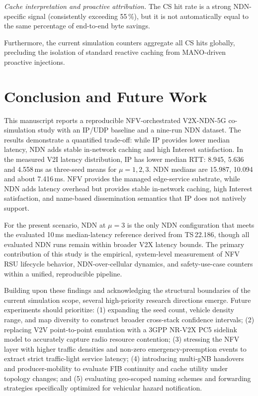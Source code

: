 \documentclass[journal]{IEEEtran}
\begin{document}
\textit{Cache interpretation and proactive attribution.} The CS hit rate is a strong NDN-specific signal (consistently exceeding 55\,\%), but it is not automatically equal to the same percentage of end-to-end byte savings.

Furthermore, the current simulation counters aggregate all CS hits globally, precluding the isolation of standard reactive caching from MANO-driven proactive injections.

\section{Conclusion and Future Work}
\label{sec:conclusion}

This manuscript reports a reproducible NFV-orchestrated V2X-NDN-5G co-simulation study with an IP/UDP baseline and a nine-run NDN dataset. The results demonstrate a quantified trade-off: while IP provides lower median latency, NDN adds stable in-network caching and high Interest satisfaction. In the measured V2I latency distribution, IP has lower median RTT: 8.945, 5.636 and 4.558\,ms as three-seed means for $\mu=1,2,3$. NDN medians are 15.987, 10.094 and about 7.416\,ms. NFV provides the managed edge-service substrate, while NDN adds latency overhead but provides stable in-network caching, high Interest satisfaction, and name-based dissemination semantics that IP does not natively support.

For the present scenario, NDN at $\mu=3$ is the only NDN configuration that meets the evaluated 10\,ms median-latency reference derived from TS\,22.186, though all evaluated NDN runs remain within broader V2X latency bounds. The primary contribution of this study is the empirical, system-level measurement of NFV RSU lifecycle behavior, NDN-over-cellular dynamics, and safety-use-case counters within a unified, reproducible pipeline.

Building upon these findings and acknowledging the structural boundaries of the current simulation scope, several high-priority research directions emerge. Future experiments should prioritize: (1) expanding the seed count, vehicle density range, and map diversity to construct broader cross-stack confidence intervals; (2) replacing V2V point-to-point emulation with a 3GPP NR-V2X PC5 sidelink model to accurately capture radio resource contention; (3) stressing the NFV layer with higher traffic densities and non-zero emergency-preemption events to extract strict traffic-light service latency; (4) introducing multi-gNB handovers and producer-mobility to evaluate FIB continuity and cache utility under topology changes; and (5) evaluating geo-scoped naming schemes and forwarding strategies specifically optimized for vehicular hazard notification.
\end{document}
